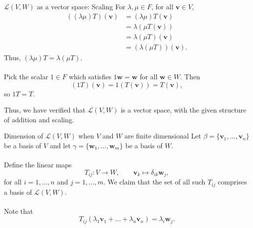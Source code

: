 \documentclass[handout]{beamer}
\def\v{\bm{v}}
\def\w{\bm{w}}
\def\L{\mathcal{L}}
\begin{document}
        \begin{frame}{$\L(V, W)$ as a vector space: Scaling}
                For $\lambda, \mu \in F$, for all $\v \in V$,
                \begin{align*}
                        ((\lambda \mu)T)(\v) &= (\lambda \mu) T(\v) \\
                                &= \lambda (\mu T(\v)) \\
                                &= \lambda (\mu T)(\v) \\
                                &= (\lambda (\mu T))(\v).
                \end{align*}
                Thus, $(\lambda \mu) T = \lambda (\mu T)$. \\~\\
                
                Pick the scalar $1 \in F$ which satisfies $1\w = \w$ for all $\w \in W$. Then
                \[
                        (1T)(\v) = 1(T(\v)) = T(\v),
                \]
                so $1T = T$.
        \end{frame}

        \begin{frame}
                Thus, we have verified that $\L(V, W)$ is a vector space, with the given structure of addition and scaling.
        \end{frame}

        \begin{frame}{Dimension of $\L(V, W)$ when $V$ and $W$ are finite dimensional}
                Let $\beta = \{\v_1, \dots, \v_n\}$ be a basis of $V$ and let $\gamma = \{\w_1, \dots, \w_m\}$ be a basis of $W$. \\~\\

                Define the linear maps
                \[
                        T_{ij}\colon V \to W, \qquad \v_k \mapsto \delta_{ik}\w_j,
                \]
                for all $i = 1, \dots, n$ and $j = 1, \dots, m$. We claim that the set of all such $T_{ij}$ comprises a basis of $\L(V, W)$. \\~\\
                \pause
                Note that 
                \[
                        T_{ij}(\lambda_1\v_1 + \dots + \lambda_n\v_n) = \lambda_i\w_j.
                \]
        \end{frame}
\end{document}
